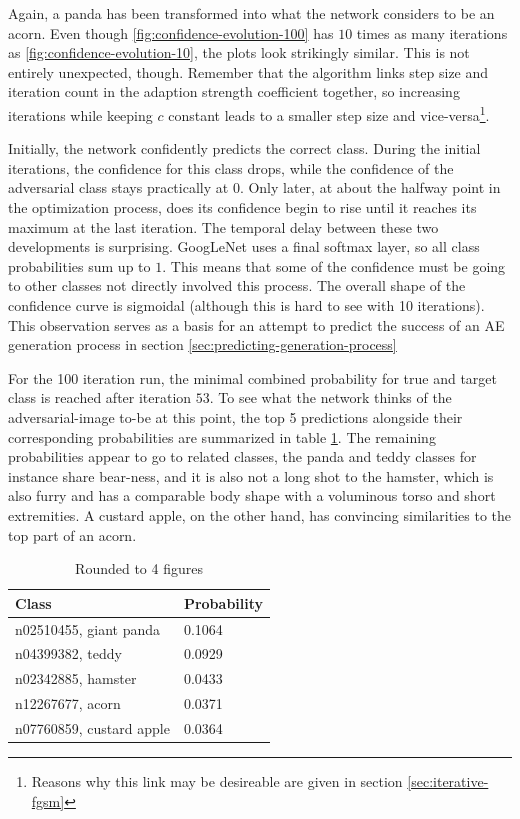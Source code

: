 \documentclass[11pt, a4paper]{article}
\begin{document}
Again, a panda has been transformed into what the network considers to be an acorn. Even though \ref{fig:confidence-evolution-100} has $10$ times as many iterations as \ref{fig:confidence-evolution-10}, the plots look strikingly similar. This is not entirely unexpected, though. Remember that the algorithm links step size and iteration count in the adaption strength coefficient together, so increasing iterations while keeping $c$ constant leads to a smaller step size and vice-versa\footnote{Reasons why this link may be desireable are given in section \ref{sec:iterative-fgsm}}.

Initially, the network confidently predicts the correct class. During the initial iterations, the confidence for this class drops, while the confidence of the adversarial class stays practically at $0$. Only later, at about the halfway point in the optimization process, does its confidence begin to rise until it reaches its maximum at the last iteration. The temporal delay between these two developments is surprising. GoogLeNet uses a final softmax layer, so all class probabilities sum up to $1$. This means that some of the confidence must be going to other classes not directly involved this process. The overall shape of the confidence curve is sigmoidal (although this is hard to see with 10 iterations). This observation serves as a basis for an attempt to predict the success of an AE generation process in section \ref{sec:predicting-generation-process}

For the 100 iteration run, the minimal combined probability for true and target class is reached after iteration $53$. To see what the network thinks of the adversarial-image to-be at this point, the top 5 predictions alongside their corresponding probabilities are summarized in table \ref{tab:ae-intermediate}. The remaining probabilities appear to go to related classes, the panda and teddy classes for instance share bear-ness, and it is also not a long shot to the hamster, which is also furry and has a comparable body shape with a voluminous torso and short extremities. A custard apple, on the other hand, has convincing similarities to the top part of an acorn.

\begin{table}[htp]
	\centering
	\begin{tabular}{|l|l|}
		\hline
		Class & Probability \\
		\hline
		n02510455, giant panda & 0.1064 \\
		n04399382, teddy & 0.0929 \\
		n02342885, hamster & 0.0433 \\
		n12267677, acorn & 0.0371 \\
		n07760859, custard apple & 0.0364 \\
		\hline
	\end{tabular}
	\caption{Rounded to 4 figures}
	\label{tab:ae-intermediate}
\end{table}
\end{document}
